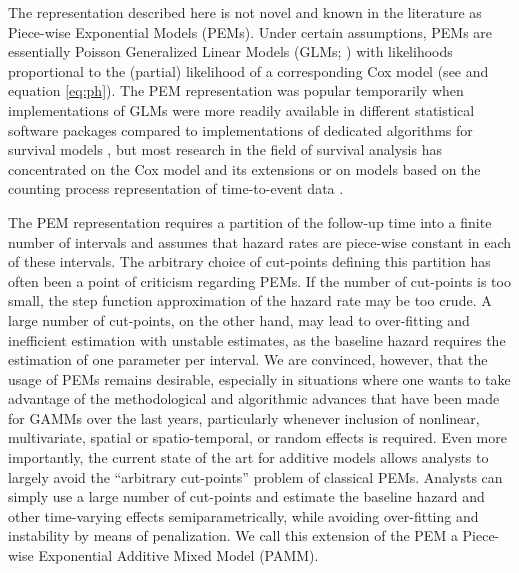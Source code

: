 \documentclass[submit]{smj}
\begin{document}
The representation described here is not novel and known in the literature as
Piece-wise Exponential Models (PEMs).
Under certain assumptions, PEMs are essentially Poisson Generalized Linear Models
(GLMs; \citealp{Holford1980, Laird1981, Friedman1982}) with likelihoods
proportional to the (partial) likelihood of a corresponding Cox model
(see \citealp{Cox:72} and equation \eqref{eq:ph}).
The PEM representation was popular temporarily when implementations of GLMs were more readily available in different statistical software packages compared to
implementations of dedicated algorithms for survival models
\citep{whitehead1980, Clayton1983},
but most research in the field of survival analysis has concentrated on the
Cox model and its extensions or on models based on the counting process
representation of time-to-event data \citep{And-etal:92,Martinussen2006}.

The PEM representation requires a partition of the follow-up time into a finite number of intervals
and assumes that hazard rates are piece-wise constant in each of these intervals.
The arbitrary choice of cut-points defining this partition has often been a point
of criticism regarding PEMs. If the number of cut-points is too small, the step
function approximation of the hazard rate may be too crude. A large number of cut-points, on the other hand, may lead to over-fitting and inefficient estimation with
unstable estimates, as the baseline hazard requires the estimation of one
parameter per interval. We are convinced, however, that
the usage of PEMs remains desirable, especially in situations where one wants to
take advantage of the methodological \citep{Wood:2011} and algorithmic
\citep{Wood2017}
advances that have been made for GAMMs over the last years, particularly whenever
inclusion of nonlinear, multivariate, spatial or spatio-temporal, or random
effects is required.
Even more importantly, the current state of the art for additive models
allows analysts to largely avoid the ``arbitrary cut-points'' problem of
classical PEMs. Analysts can simply use a
large number of cut-points and estimate the baseline hazard and
other time-varying effects semiparametrically, while avoiding over-fitting and instability by
means of penalization. We call this extension of the PEM a Piece-wise
Exponential Additive Mixed Model (PAMM).
\end{document}
